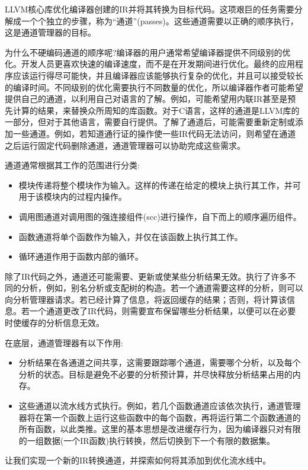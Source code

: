 LLVM核心库优化编译器创建的IR并将其转换为目标代码。这项艰巨的任务需要分解成一个个独立的步骤，称为“通道”(passes)。这些通道需要以正确的顺序执行，这是通道管理器的目标。

为什么不硬编码通道的顺序呢?编译器的用户通常希望编译器提供不同级别的优化。开发人员更喜欢快速的编译速度，而不是在开发期间进行优化。最终的应用程序应该运行得尽可能快，并且编译器应该能够执行复杂的优化，并且可以接受较长的编译时间。不同级别的优化需要执行不同数量的优化，所以编译器作者可能希望提供自己的通道，以利用自己对语言的了解。例如，可能希望用内联IR甚至是预先计算的结果，来替换众所周知的库函数。对于C语言，这样的通道是LLVM库的一部分，但对于其他语言，需要自行提供。了解了通道后，可能需要重新定制或添加一些通道。例如，若知道通行证的操作使一些IR代码无法访问，则希望在通道之后运行固定代码删除通道，通道管理器可以协助完成这些需求。

通道通常根据其工作的范围进行分类:

\begin{itemize}
\item
模块传递将整个模块作为输入。这样的传递在给定的模块上执行其工作，并可用于该模块内的过程内操作。

\item
调用图通道对调用图的强连接组件(scc)进行操作，自下而上的顺序遍历组件。

\item
函数通道将单个函数作为输入，并仅在该函数上执行其工作。

\item
循环通道作用于函数内部的循环。
\end{itemize}

除了IR代码之外，通道还可能需要、更新或使某些分析结果无效。执行了许多不同的分析，例如，别名分析或支配树的构造。若一个通道需要这样的分析，则可以向分析管理器请求。若已经计算了信息，将返回缓存的结果；否则，将计算该信息。若一个通道更改了IR代码，则需要宣布保留哪些分析结果，以便可以在必要时使缓存的分析信息无效。

在底层，通道管理器有以下作用:

\begin{itemize}
\item
分析结果在各通道之间共享，这需要跟踪哪个通道，需要哪个分析，以及每个分析的状态。目标是避免不必要的分析预计算，并尽快释放分析结果占用的内存。

\item
这些通道以流水线方式执行。例如，若几个函数通道应该依次执行，通道管理器将在第一个函数上运行这些函数中的每个函数，再将运行第二个函数通道的所有函数，以此类推。这里的基本思想是改进缓存行为，因为编译器只对有限的一组数据(一个IR函数)执行转换，然后切换到下一个有限的数据集。
\end{itemize}

让我们实现一个新的IR转换通道，并探索如何将其添加到优化流水线中。
















